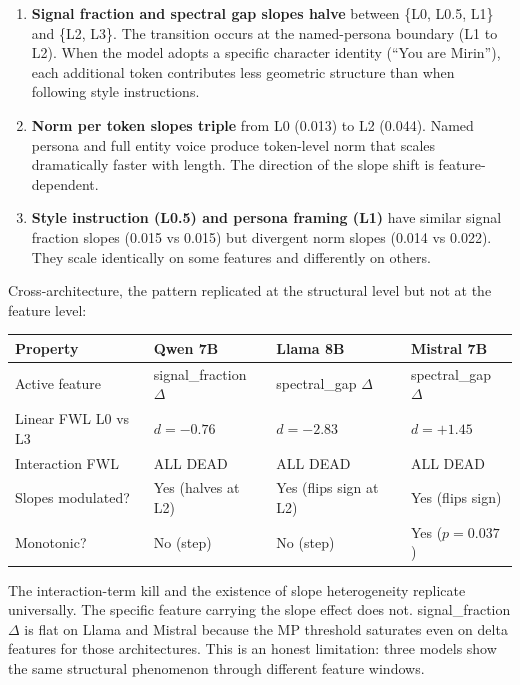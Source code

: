 \documentclass[11pt]{article}
\begin{document}
\begin{enumerate}
  \item \textbf{Signal fraction and spectral gap slopes halve} between \{L0, L0.5, L1\} and \{L2, L3\}. The transition occurs at the named-persona boundary (L1 to L2). When the model adopts a specific character identity (``You are Mirin''), each additional token contributes less geometric structure than when following style instructions.

  \item \textbf{Norm per token slopes triple} from L0 (0.013) to L2 (0.044). Named persona and full entity voice produce token-level norm that scales dramatically faster with length. The direction of the slope shift is feature-dependent.

  \item \textbf{Style instruction (L0.5) and persona framing (L1)} have similar signal fraction slopes (0.015 vs 0.015) but divergent norm slopes (0.014 vs 0.022). They scale identically on some features and differently on others.
\end{enumerate}

Cross-architecture, the pattern replicated at the structural level but not at the feature level:

\begin{table}[H]
\centering
\begin{tabular}{llll}
\toprule
Property & Qwen 7B & Llama 8B & Mistral 7B \\
\midrule
Active feature & signal\_fraction $\Delta$ & spectral\_gap $\Delta$ & spectral\_gap $\Delta$ \\
Linear FWL L0 vs L3 & $d = -0.76$ & $d = -2.83$ & $d = +1.45$ \\
Interaction FWL & ALL DEAD & ALL DEAD & ALL DEAD \\
Slopes modulated? & Yes (halves at L2) & Yes (flips sign at L2) & Yes (flips sign) \\
Monotonic? & No (step) & No (step) & Yes ($p = 0.037$) \\
\bottomrule
\end{tabular}
\end{table}

The interaction-term kill and the existence of slope heterogeneity replicate universally. The specific feature carrying the slope effect does not. signal\_fraction $\Delta$ is flat on Llama and Mistral because the MP threshold saturates even on delta features for those architectures. This is an honest limitation: three models show the same structural phenomenon through different feature windows.
\end{document}
